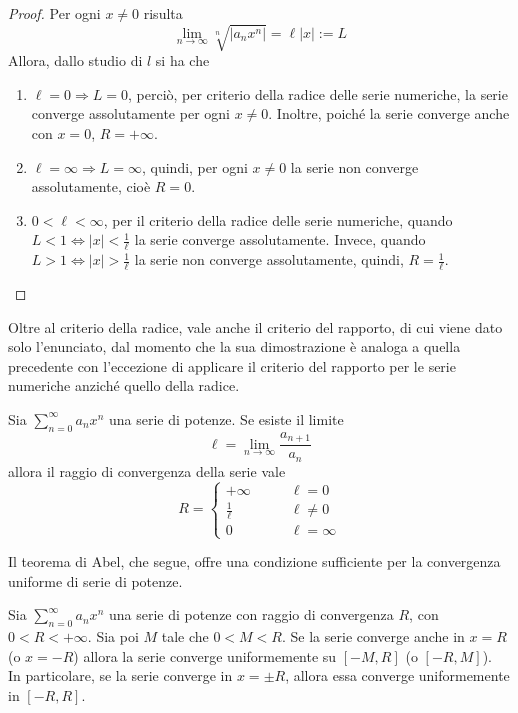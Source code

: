 \begin{proof}
    Per ogni $x \neq 0$ risulta
    \begin{equation}
        \lim_{n \to \infty}{\sqrt[n]{|a_n x^n|}} = \ell|x| := L
    \end{equation}
    Allora, dallo studio di $l$ si ha che
    \begin{enumerate}
        \item $\ell=0 \Rightarrow L=0$, perciò, per criterio della radice delle serie numeriche, la serie converge assolutamente per ogni $x \neq 0$. Inoltre, poiché la serie converge anche con $x=0$, $R=+\infty$.
        \item $\ell= \infty \Rightarrow L = \infty$, quindi, per ogni $x \neq 0$ la serie non converge assolutamente, cioè $R=0$.
        \item $0< \ell<\infty$, per il criterio della radice delle serie numeriche, quando $L<1 \iff |x|< \tfrac{1}{\ell}$ la serie converge assolutamente. Invece, quando $L>1 \iff |x|>\tfrac{1}{\ell}$ la serie non converge assolutamente, quindi, $R= \tfrac{1}{\ell}$.
    \end{enumerate}
\end{proof}
Oltre al criterio della radice, vale anche il criterio del rapporto, di cui viene dato solo l'enunciato, dal momento che la sua dimostrazione è analoga a quella precedente con l'eccezione di applicare il criterio del rapporto per le serie numeriche anziché quello della radice.
\begin{theorem}
    Sia $\sum\limits_{n=0}^{\infty}{a_n x^n}$ una serie di potenze. Se esiste il limite
    \begin{equation}
        \ell= \lim_{n \to \infty}{\frac{a_{n+1}}{a_n}}
    \end{equation}
    allora il raggio di convergenza della serie vale
    \begin{equation}
        R= \begin{cases}
        +\infty &\qquad \ell=0\\
        \frac{1}{\ell} &\qquad \ell \neq 0\\
        0 &\qquad \ell = \infty
        \end{cases}
    \end{equation}
\end{theorem}
Il teorema di Abel, che segue, offre una condizione sufficiente per la convergenza uniforme di serie di potenze.
\begin{theorem} \label{Teo: Teorema di Abel}
    Sia $\sum\limits_{n=0}^{\infty}{a_n x^n}$ una serie di potenze con raggio di convergenza $R$, con $0<R<+\infty$. Sia poi $M$ tale che $0<M<R$. Se la serie converge anche in $x=R$ (o $x=-R$) allora la serie converge uniformemente su $[-M, R]$ (o $[-R, M]$). \\
    In particolare, se la serie converge in $x= \pm R$, allora essa converge uniformemente in $[-R, R]$.
\end{theorem}

